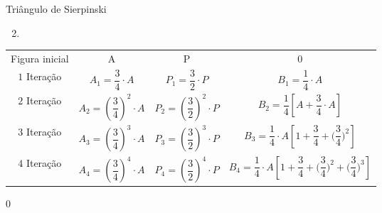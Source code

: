 \begin{answer}{Triângulo de Sierpinski}
{
\begin{enumerate}\setcounter{enumi}{1}
\item\phantom{a}
\end{enumerate}

\setlength\tabulinesep{2.5pt}
\setlength\tabcolsep{2.5pt}
\begin{tabu} to \linewidth{|c|c|c|c|}
\hline
{} &  &  &  \\ 
\hline
Figura inicial & A & P & 0 \\ 
\hline

$1$ Iteração & 
$A_1=\dfrac{3}{4}\cdot A$ & 
$P_1=\dfrac{3}{2}\cdot P$ & 
$B_1=\dfrac{1}{4}\cdot A$ \\ 
\hline

$2$ Iteração & 
$A_2=\left(\dfrac{3}{4}\right)^2\cdot A$ & 
$P_2=\left(\dfrac{3}{2}\right)^2\cdot P$ & 
$B_2=\dfrac{1}{4}\left[A+\dfrac{3}{4}\cdot A\right]$ \\ 
\hline

$3$ Iteração & 
$A_3=\left(\dfrac{3}{4}\right)^3\cdot A$ & 
$P_3=\left(\dfrac{3}{2}\right)^3\cdot P$ & 
$B_3=\dfrac{1}{4}\cdot A\left[1+\dfrac{3}{4}+\bigg(\dfrac{3}{4}\bigg)^2\right]$\\ 
\hline

$4$ Iteração & 
$A_4=\left(\dfrac{3}{4}\right)^4\cdot A$ & 
$P_4=\left(\dfrac{3}{2}\right)^4\cdot P$& 
$B_4=\dfrac{1}{4}\cdot A\left[1+\dfrac{3}{4}+\bigg(\dfrac{3}{4}\bigg)^2+\bigg(\dfrac{3}{4}\bigg)^3\right]$\\ 
\hline
\end{tabu}

}{0}
\end{answer}


